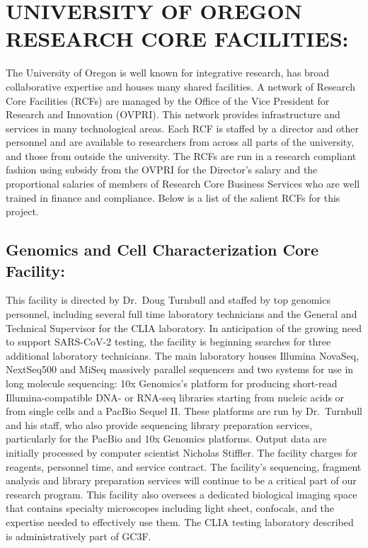 \documentclass[
]{book}
\begin{document}
\hypertarget{university-of-oregon-research-core-facilities}{%
\section{UNIVERSITY OF OREGON RESEARCH CORE FACILITIES:}\label{university-of-oregon-research-core-facilities}}

The University of Oregon is well known for integrative research, has broad collaborative expertise and houses many shared facilities. A network of Research Core Facilities (RCFs) are managed by the Office of the Vice President for Research and Innovation (OVPRI). This network provides infrastructure and services in many technological areas. Each RCF is staffed by a director and other personnel and are available to researchers from across all parts of the university, and those from outside the university. The RCFs are run in a research compliant fashion using subsidy from the OVPRI for the Director's salary and the proportional salaries of members of Research Core Business Services who are well trained in finance and compliance. Below is a list of the salient RCFs for this project.

\hypertarget{genomics-and-cell-characterization-core-facility}{%
\subsection{Genomics and Cell Characterization Core Facility:}\label{genomics-and-cell-characterization-core-facility}}

This facility is directed by Dr.~Doug Turnbull and staffed by top genomics personnel, including several full time laboratory technicians and the General and Technical Supervisor for the CLIA laboratory. In anticipation of the growing need to support SARS-CoV-2 testing, the facility is beginning searches for three additional laboratory technicians. The main laboratory houses Illumina NovaSeq, NextSeq500 and MiSeq massively parallel sequencers and two systems for use in long molecule sequencing: 10x Genomics's platform for producing short-read Illumina-compatible DNA- or RNA-seq libraries starting from nucleic acids or from single cells and a PacBio Sequel II. These platforms are run by Dr.~Turnbull and his staff, who also provide sequencing library preparation services, particularly for the PacBio and 10x Genomics platforms. Output data are initially processed by computer scientist Nicholas Stiffler. The facility charges for reagents, personnel time, and service contract. The facility's sequencing, fragment analysis and library preparation services will continue to be a critical part of our research program. This facility also oversees a dedicated biological imaging space that contains specialty microscopes including light sheet, confocals, and the expertise needed to effectively use them. The CLIA testing laboratory described is administratively part of GC3F.
\end{document}
